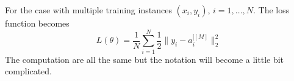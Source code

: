 \documentclass{article}
\begin{document}
            For the case with multiple training instances $(x_i, y_i)$, $i=1,\dots,N$. The loss function becomes
            \[
                L(\theta) = \frac{1}{N} \sum_{i=1}^N \frac{1}{2} \|y_i - a_i^{[ [M] }\|_2^2    
            \]
            The computation are all the same but the notation will become a little bit complicated.
\end{document}
